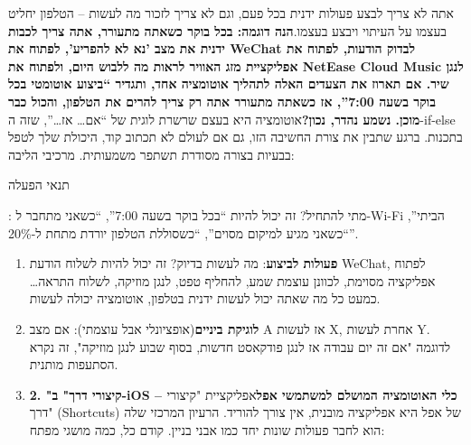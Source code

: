 


אתה לא צריך לבצע פעולות ידנית בכל פעם, וגם לא צריך לזכור מה לעשות – הטלפון יחליט בעצמו על העיתוי ויבצע בעצמו.\textbf{הנה דוגמה: בכל בוקר כשאתה מתעורר, אתה צריך לכבות ידנית את מצב 'נא לא להפריע', לפתוח את WeChat לבדוק הודעות, לפתוח את אפליקציית מזג האוויר לראות מה ללבוש היום, ולפתוח את NetEase Cloud Music לנגן שיר. אם תארוז את הצעדים האלה לתהליך אוטומציה אחד, ותגדיר “ביצוע אוטומטי בכל בוקר בשעה 7:00”, אז כשאתה מתעורר אתה רק צריך להרים את הטלפון, והכול כבר מוכן. נשמע נהדר, נכון?}אוטומציה היא בעצם שרשרת לוגית של “אם… אז…”, שזה ה-if-else בתכנות. ברגע שתבין את צורת החשיבה הזו, גם אם לעולם לא תכתוב קוד, היכולת שלך לטפל בבעיות בצורה מסודרת תשתפר משמעותית. מרכיבי הליבה:

תנאי הפעלה

: מתי להתחיל? זה יכול להיות “בכל בוקר בשעה 7:00”, “כשאני מתחבר ל-Wi-Fi הביתי”, “כשאני מגיע למיקום מסוים”, “כשסוללת הטלפון יורדת מתחת ל-20\%”.

\begin{enumerate}
  \item \textbf{פעולות לביצוע}: מה לעשות בדיוק? זה יכול להיות לשלוח הודעת WeChat, לפתוח אפליקציה מסוימת, לכוונן עוצמת שמע, להחליף טפט, לנגן מוזיקה, לשלוח התראה… כמעט כל מה שאתה יכול לעשות ידנית בטלפון, אוטומציה יכולה לעשות.
  \item \textbf{לוגיקת ביניים}(אופציונלי אבל עוצמתי): אם מצב A אז לעשות X, אחרת לעשות Y. לדוגמה "אם זה יום עבודה אז לנגן פודקאסט חדשות, בסוף שבוע לנגן מוזיקה", זה נקרא הסתעפות מותנית.
  \item \textbf{2. "קיצורי דרך" ב-iOS – כלי האוטומציה המושלם למשתמשי אפל}אפליקציית "קיצורי דרך" (Shortcuts) של אפל היא אפליקציה מובנית, אין צורך להוריד. הרעיון המרכזי שלה הוא לחבר פעולות שונות יחד כמו אבני בניין. קודם כל, כמה מושגי מפתח:
\end{enumerate}


